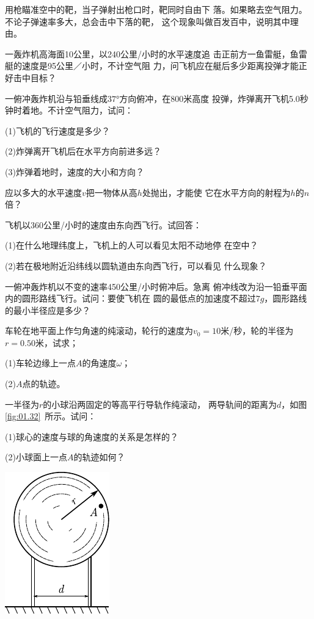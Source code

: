 \exercise 用枪瞄准空中的靶，当子弹射出枪口时，靶同时自由下
落。如果略去空气阻力。不论子弹速率多大，总会击中下落的靶，
这个现象叫做百发百中，说明其中理由。

\exercise 一轰炸机高海面10公里，以240公里/小时的水平速度追
击正前方一鱼雷艇，鱼雷艇的速度是95公里／小时，不计空气阻
力，问飞机应在艇后多少距离投弹才能正好击中目标？

\exercise 一俯冲轰炸机沿与铅垂线成$\ang{37;;}$方向俯冲，在800米高度
投弹，炸弹离开飞机5.0秒钟时着地。不计空气阻力，试问：

(1)飞机的飞行速度是多少？

(2)炸弹离开飞机后在水平方向前进多远？

(3)炸弹着地时，速度的大小和方向？

\exercise 应以多大的水平速度$v$把一物体从高$h$处抛出，才能使
它在水平方向的射程为$h$的$n$倍？

\exercise 飞机以360公里/小时的速度由东向西飞行。试回答：

(1)在什么地理纬度上，飞机上的人可以看见太阳不动地停
在空中？

(2)若在极地附近沿纬线以圆轨道由东向西飞行，可以看见
什么现象？

\exercise 一俯冲轰炸机以不变的速率450公里/小时俯冲后。急离
俯冲线改为沿一铅垂平面内的圆形路线飞行。试问：要使飞机在
圆的最低点的加速度不超过$7g$，圆形路线的最小半径应是多少？

\exercise 车轮在地平面上作匀角速的纯滚动，轮行的速度为$v_0=
10$米/秒，轮的半径为$r=0.50$米，试求；

(1)车轮边缘上一点$A$的角速度$\omega$；

(2)$A$点的轨迹。

\exercise 一半径为$r$的小球沿两固定的等高平行导轨作纯滚动，
两导轨间的距离为$d$，如图\ref{fig:01.32}~所示。试问：

(1)球心的速度与球的角速度的关系是怎样的？

(2)小球面上一点$A$的轨迹如何？
\begin{figurex}
    \begin{center}
        \includegraphics{figure/fig01.32}
        \caption{}
        \label{fig:01.32}
    \end{center}
\end{figurex}